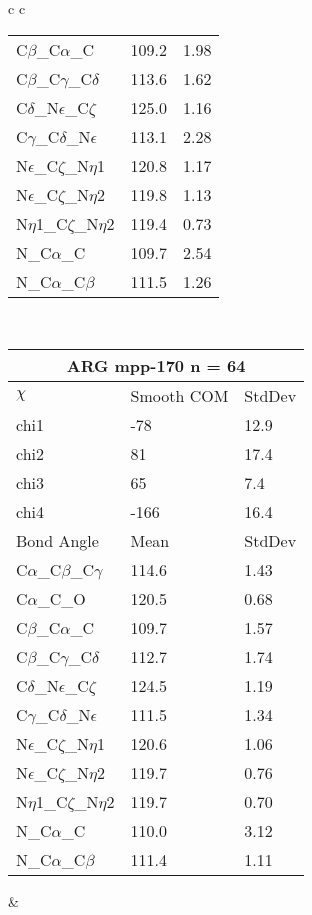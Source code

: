 \begin{longtable}{ c c }
\begin{tabular}{ l l l }
  C$\beta$\_C$\alpha$\_C & 109.2 & 1.98\\
  C$\beta$\_C$\gamma$\_C$\delta$ & 113.6 & 1.62\\
  C$\delta$\_N$\epsilon$\_C$\zeta$ & 125.0 & 1.16\\
  C$\gamma$\_C$\delta$\_N$\epsilon$ & 113.1 & 2.28\\
  N$\epsilon$\_C$\zeta$\_N$\eta$1 & 120.8 & 1.17\\
  N$\epsilon$\_C$\zeta$\_N$\eta$2 & 119.8 & 1.13\\
  N$\eta$1\_C$\zeta$\_N$\eta$2 & 119.4 & 0.73\\
  N\_C$\alpha$\_C & 109.7 & 2.54\\
  N\_C$\alpha$\_C$\beta$ & 111.5 & 1.26\\
  \bottomrule
  \end{tabular}
  \\
  \begin{tabular}{ l l l }
  \toprule
  \multicolumn{3}{c}{ARG \textbf{mpp-170} n = 64} \\ \toprule
  $\chi$       & Smooth COM & StdDev \\ \midrule
  chi1 & -78 & 12.9 \\ 
  chi2 & 81 & 17.4 \\ 
  chi3 & 65 & 7.4 \\ 
  chi4 & -166 & 16.4 \\ \midrule
  Bond Angle   & Mean     & StdDev \\ \midrule
  C$\alpha$\_C$\beta$\_C$\gamma$ & 114.6 & 1.43\\
  C$\alpha$\_C\_O & 120.5 & 0.68\\
  C$\beta$\_C$\alpha$\_C & 109.7 & 1.57\\
  C$\beta$\_C$\gamma$\_C$\delta$ & 112.7 & 1.74\\
  C$\delta$\_N$\epsilon$\_C$\zeta$ & 124.5 & 1.19\\
  C$\gamma$\_C$\delta$\_N$\epsilon$ & 111.5 & 1.34\\
  N$\epsilon$\_C$\zeta$\_N$\eta$1 & 120.6 & 1.06\\
  N$\epsilon$\_C$\zeta$\_N$\eta$2 & 119.7 & 0.76\\
  N$\eta$1\_C$\zeta$\_N$\eta$2 & 119.7 & 0.70\\
  N\_C$\alpha$\_C & 110.0 & 3.12\\
  N\_C$\alpha$\_C$\beta$ & 111.4 & 1.11\\
  \bottomrule
  \end{tabular}
  &
  \begin{tabular}{ l l l }

\end{tabular}
\end{longtable}
